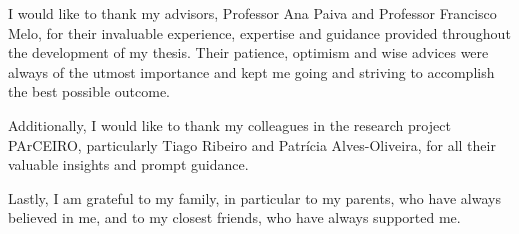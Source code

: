 \begin{acknowledgments}

I would like to thank my advisors, Professor Ana Paiva and Professor Francisco Melo, for their invaluable experience, expertise and guidance provided throughout the development of my thesis. Their patience, optimism and wise advices were always of the utmost importance and kept me going and striving to accomplish the best possible outcome.

Additionally, I would like to thank my colleagues in the research project PArCEIRO, particularly Tiago Ribeiro and Patrícia Alves-Oliveira, for all their valuable insights and prompt guidance.

Lastly, I am grateful to my family, in particular to my parents, who have always believed in me, and to my closest friends, who have always supported me.

\end{acknowledgments}